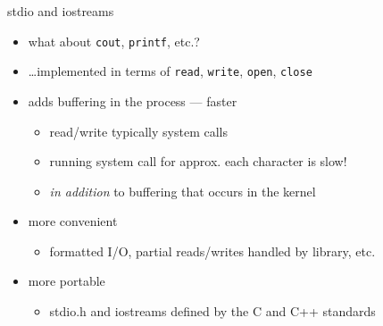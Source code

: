 \begin{frame}{stdio and iostreams}
\begin{itemize}
\item what about \texttt{cout}, \texttt{printf}, etc.?
\item \ldots implemented in terms of \texttt{read}, \texttt{write}, \texttt{open}, \texttt{close}
\vspace{.5cm}
\item adds buffering in the process --- faster
    \begin{itemize}
    \item read/write typically system calls
    \item running system call for approx. each character is slow!
    \item \textit{in addition} to buffering that occurs in the kernel
    \end{itemize}
\item more convenient
    \begin{itemize}
    \item formatted I/O, partial reads/writes handled by library, etc.
    \end{itemize}
\item more portable
    \begin{itemize}
    \item stdio.h and iostreams defined by the C and C++ standards
    \end{itemize}
\end{itemize}
\end{frame}
